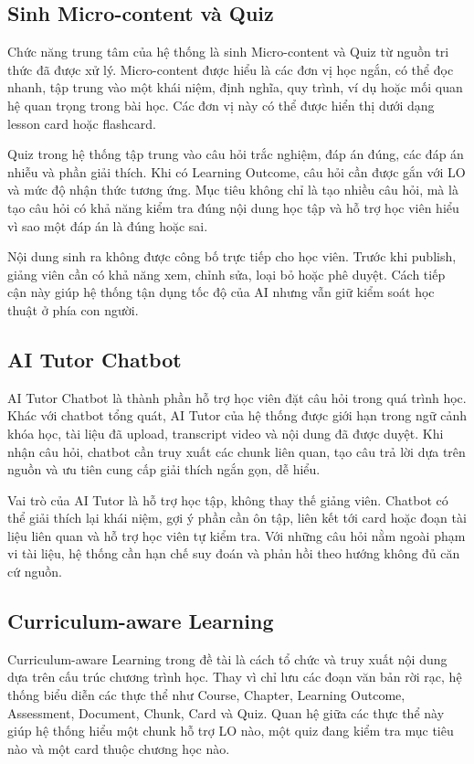 \subsection{Sinh Micro-content và Quiz}

Chức năng trung tâm của hệ thống là sinh Micro-content và Quiz từ nguồn tri
thức đã được xử lý. Micro-content được hiểu là các đơn vị học ngắn, có thể
đọc nhanh, tập trung vào một khái niệm, định nghĩa, quy trình, ví dụ hoặc mối
quan hệ quan trọng trong bài học. Các đơn vị này có thể được hiển thị dưới
dạng lesson card hoặc flashcard.

Quiz trong hệ thống tập trung vào câu hỏi trắc nghiệm, đáp án đúng, các đáp án
nhiễu và phần giải thích. Khi có Learning Outcome, câu hỏi cần được gắn với LO
và mức độ nhận thức tương ứng. Mục tiêu không chỉ là tạo nhiều câu hỏi, mà là
tạo câu hỏi có khả năng kiểm tra đúng nội dung học tập và hỗ trợ học viên hiểu
vì sao một đáp án là đúng hoặc sai.

Nội dung sinh ra không được công bố trực tiếp cho học viên. Trước khi publish,
giảng viên cần có khả năng xem, chỉnh sửa, loại bỏ hoặc phê duyệt. Cách tiếp
cận này giúp hệ thống tận dụng tốc độ của AI nhưng vẫn giữ kiểm soát học thuật
ở phía con người.

\subsection{AI Tutor Chatbot}

AI Tutor Chatbot là thành phần hỗ trợ học viên đặt câu hỏi trong quá trình học.
Khác với chatbot tổng quát, AI Tutor của hệ thống được giới hạn trong ngữ cảnh
khóa học, tài liệu đã upload, transcript video và nội dung đã được duyệt. Khi
nhận câu hỏi, chatbot cần truy xuất các chunk liên quan, tạo câu trả lời dựa
trên nguồn và ưu tiên cung cấp giải thích ngắn gọn, dễ hiểu.

Vai trò của AI Tutor là hỗ trợ học tập, không thay thế giảng viên. Chatbot có
thể giải thích lại khái niệm, gợi ý phần cần ôn tập, liên kết tới card hoặc
đoạn tài liệu liên quan và hỗ trợ học viên tự kiểm tra. Với những câu hỏi nằm
ngoài phạm vi tài liệu, hệ thống cần hạn chế suy đoán và phản hồi theo hướng
không đủ căn cứ nguồn.

\subsection{Curriculum-aware Learning}

Curriculum-aware Learning trong đề tài là cách tổ chức và truy xuất nội dung
dựa trên cấu trúc chương trình học. Thay vì chỉ lưu các đoạn văn bản rời rạc,
hệ thống biểu diễn các thực thể như Course, Chapter, Learning Outcome,
Assessment, Document, Chunk, Card và Quiz. Quan hệ giữa các thực thể này giúp
hệ thống hiểu một chunk hỗ trợ LO nào, một quiz đang kiểm tra mục tiêu nào và
một card thuộc chương học nào.

